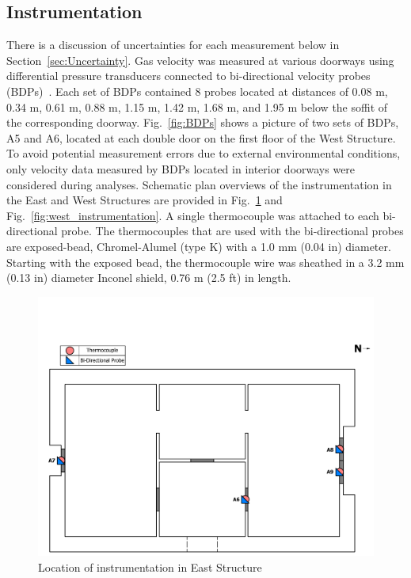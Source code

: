 \documentclass[12pt,oneside]{book}
\begin{document}
\subsection{Instrumentation}
\label{sec:Instrumentation}
There is a discussion of uncertainties for each measurement below in Section~\ref{sec:Uncertainty}. Gas velocity was measured at various doorways using differential pressure transducers connected to bi-directional velocity probes (BDPs)~\cite{McCaffrey:Combustion_and_Flame}. Each set of BDPs contained 8 probes located at distances of 0.08 m, 0.34 m, 0.61 m, 0.88 m, 1.15 m, 1.42 m, 1.68 m, and 1.95 m below the soffit of the corresponding doorway. Fig.~\ref{fig:BDPs} shows a picture of two sets of BDPs, A5 and A6, located at each double door on the first floor of the West Structure. To avoid potential measurement errors due to external environmental conditions, only velocity data measured by BDPs located in interior doorways were considered during analyses. Schematic plan overviews of the instrumentation in the East and West Structures are provided in Fig.~\ref{fig:east_instrumentation} and Fig.~\ref{fig:west_instrumentation}. A single thermocouple was attached to each bi-directional probe. The thermocouples that are used with the bi-directional probes are exposed-bead, Chromel-Alumel (type K) with a 1.0 mm (0.04 in) diameter. Starting with the exposed bead, the thermocouple wire was sheathed in a 3.2 mm (0.13 in) diameter Inconel shield, 0.76 m (2.5 ft) in length.

\begin{figure}[!ht]
\includegraphics[trim=0cm 0cm 0.25cm 3.75cm, clip=true, width=6in]{../Drawings/Instrumentation/East_Structure_Devices_Hose_Test}
\caption[Location of Instrumentation in East Structure]{Location of instrumentation in East Structure}
\label{fig:east_instrumentation}
\end{figure}
\end{document}

